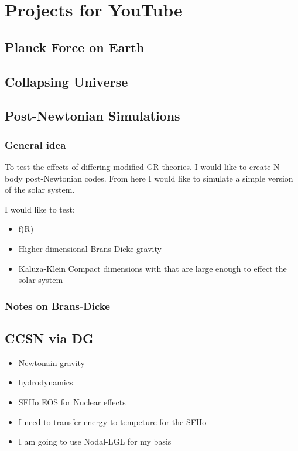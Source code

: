 \chapter{Projects for YouTube}

\section{Planck Force on Earth}


\section{Collapsing Universe}


\section{Post-Newtonian Simulations}


\subsection{General idea}

To test the effects of differing modified GR theories. I would like to create N-body post-Newtonian codes. From here I would like to simulate a simple version of the solar system.

I would like to test:
\begin{itemize}
  \item f(R)
  \item Higher dimensional Brans-Dicke gravity
  \item Kaluza-Klein Compact dimensions with that are large enough to effect the solar system
\end{itemize}

\subsection{Notes on Brans-Dicke}



\section{CCSN via DG}

\begin{itemize}
  \item Newtonain gravity
  \item hydrodynamics
  \item SFHo EOS for Nuclear effects
  \item I need to transfer energy to tempeture for the SFHo
  \item I am going to use Nodal-LGL for my basis
\end{itemize}

